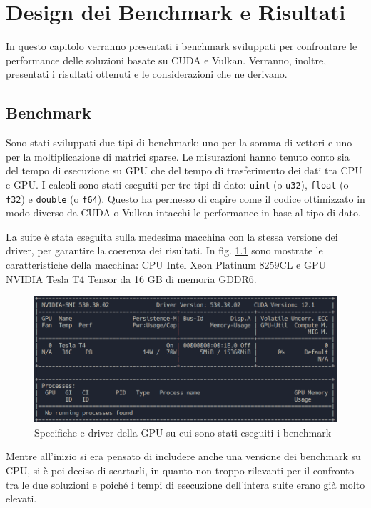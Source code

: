 \chapter{Design dei Benchmark e Risultati}
\label{sec:benchmark}

In questo capitolo verranno presentati i benchmark sviluppati per confrontare le performance delle soluzioni basate su CUDA e Vulkan. Verranno, inoltre, presentati i risultati ottenuti e le considerazioni che ne derivano.

\section{Benchmark}

Sono stati sviluppati due tipi di benchmark: uno per la somma di vettori e uno per la moltiplicazione di matrici sparse. Le misurazioni hanno tenuto conto sia del tempo di esecuzione su GPU che del tempo di trasferimento dei dati tra CPU e GPU. I calcoli sono stati eseguiti per tre tipi di dato: \verb|uint| (o \verb|u32|), \verb|float| (o \verb|f32|) e \verb|double| (o \verb|f64|). Questo ha permesso di capire come il codice ottimizzato in modo diverso da CUDA o Vulkan intacchi le performance in base al tipo di dato. 

La suite è stata eseguita sulla medesima macchina con la stessa versione dei driver, per garantire la coerenza dei risultati. In fig. \ref{fig:macchina} sono mostrate le caratteristiche della macchina: CPU Intel Xeon Platinum 8259CL e GPU NVIDIA Tesla T4 Tensor da 16 GB di memoria GDDR6.

\begin{figure}[ht]
    \centering
    \includegraphics[width=.9\linewidth]{images/chapter4/macchina.png}
    \caption{Specifiche e driver della GPU su cui sono stati eseguiti i benchmark}
    \label{fig:macchina}
\end{figure}

Mentre all'inizio si era pensato di includere anche una versione dei benchmark su CPU, si è poi deciso di scartarli, in quanto non troppo rilevanti per il confronto tra le due soluzioni e poiché i tempi di esecuzione dell'intera suite erano già molto elevati. 

